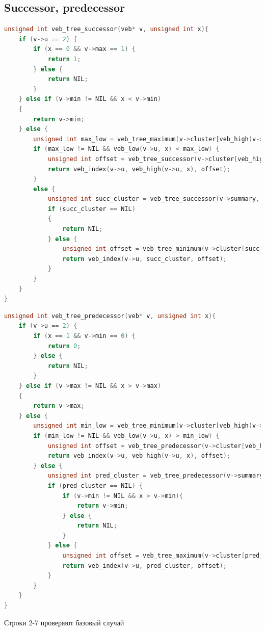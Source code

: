 \documentclass{article}
\begin{document}
\subsection{Successor, predecessor}
\begin{lstlisting}[language=C,style=C]
unsigned int veb_tree_successor(veb* v, unsigned int x){
    if (v->u == 2) {
        if (x == 0 && v->max == 1) {
            return 1;
        } else {
            return NIL;
        }
    } else if (v->min != NIL && x < v->min)
    {
        return v->min;
    } else {
        unsigned int max_low = veb_tree_maximum(v->cluster[veb_high(v->u,x)]);
        if (max_low != NIL && veb_low(v->u, x) < max_low) {
            unsigned int offset = veb_tree_successor(v->cluster[veb_high(v->u, x)], veb_low(v->u,x));
            return veb_index(v->u, veb_high(v->u, x), offset);
        }
        else {
            unsigned int succ_cluster = veb_tree_successor(v->summary, veb_high(v->u,x));
            if (succ_cluster == NIL)
            {
                return NIL;
            } else {
                unsigned int offset = veb_tree_minimum(v->cluster[succ_cluster]);
                return veb_index(v->u, succ_cluster, offset);
            }
        }
    }
}
\end{lstlisting}
\begin{lstlisting}[language=C,style=C]
unsigned int veb_tree_predecessor(veb* v, unsigned int x){
    if (v->u == 2) {
        if (x == 1 && v->min == 0) {
            return 0;
        } else {
            return NIL;
        }
    } else if (v->max != NIL && x > v->max)
    {
        return v->max;
    } else {
        unsigned int min_low = veb_tree_minimum(v->cluster[veb_high(v->u, x)]);
        if (min_low != NIL && veb_low(v->u, x) > min_low) {
            unsigned int offset = veb_tree_predecessor(v->cluster[veb_high(v->u, x)], veb_low(v->u, x));
            return veb_index(v->u, veb_high(v->u, x), offset);
        } else {
            unsigned int pred_cluster = veb_tree_predecessor(v->summary, veb_high(v->u, x));
            if (pred_cluster == NIL) {
                if (v->min != NIL && x > v->min){
                    return v->min;
                } else {
                    return NIL;
                }
            } else {
                unsigned int offset = veb_tree_maximum(v->cluster[pred_cluster]);
                return veb_index(v->u, pred_cluster, offset);
            }
        }
    }
}
\end{lstlisting}
Строки 2-7 проверяют базовый случай 
\end{document}
